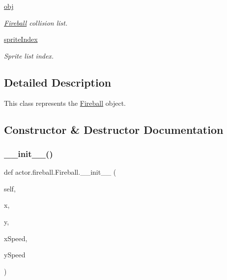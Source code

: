 \begin{DoxyCompactItemize}
\hyperlink{classactor_1_1fireball_1_1_fireball_a2e9d4868a5b6a944121481b9f82bd37d}{obj}
\begin{DoxyCompactList}\small\item\em \hyperlink{classactor_1_1fireball_1_1_fireball}{Fireball} collision list. \end{DoxyCompactList}\item 
\mbox{\label{classactor_1_1fireball_1_1_fireball_a73fd4922f27fe97472bd1e66ec809077}} 
\hyperlink{classactor_1_1fireball_1_1_fireball_a73fd4922f27fe97472bd1e66ec809077}{sprite\+Index}
\begin{DoxyCompactList}\small\item\em Sprite list index. \end{DoxyCompactList}\end{DoxyCompactItemize}


\subsection{Detailed Description}
This class represents the \hyperlink{classactor_1_1fireball_1_1_fireball}{Fireball} object. 

\subsection{Constructor \& Destructor Documentation}
\mbox{\label{classactor_1_1fireball_1_1_fireball_a8e8de406c4754cea725b3800053bbabc}} 
\subsubsection{\texorpdfstring{\+\_\+\+\_\+init\+\_\+\+\_\+()}{\_\_init\_\_()}}
{\footnotesize\ttfamily def actor.\+fireball.\+Fireball.\+\_\+\+\_\+init\+\_\+\+\_\+ (\begin{DoxyParamCaption}\item[{}]{self,  }\item[{}]{x,  }\item[{}]{y,  }\item[{}]{x\+Speed,  }\item[{}]{y\+Speed }\end{DoxyParamCaption})}



